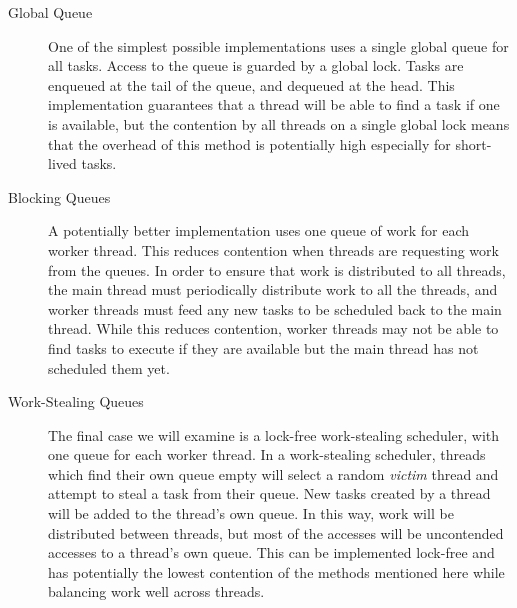 \begin{description}
\item[Global Queue] One of the simplest possible implementations uses a single global queue for all tasks. Access to the queue is guarded by a global lock. Tasks are enqueued at the tail of the queue, and dequeued at the head. This implementation guarantees that a thread will be able to find a task if one is available, but the contention by all threads on a single global lock means that the overhead of this method is potentially high especially for short-lived tasks.

\item[Blocking Queues] A potentially better implementation uses one queue of work for each worker thread. This reduces contention when threads are requesting work from the queues. In order to ensure that work is distributed to all threads, the main thread must periodically distribute work to all the threads, and worker threads must feed any new tasks to be scheduled back to the main thread. While this reduces contention, worker threads may not be able to find tasks to execute if they are available but the main thread has not scheduled them yet.

\item[Work-Stealing Queues] The final case we will examine is a lock-free work-stealing scheduler, with one queue for each worker thread. In a work-stealing scheduler, threads which find their own queue empty will select a random \emph{victim} thread and attempt to steal a task from their queue. New tasks created by a thread will be added to the thread's own queue. In this way, work will be distributed between threads, but most of the accesses will be uncontended accesses to a thread's own queue. This can be implemented lock-free and has potentially the lowest contention of the methods mentioned here while balancing work well across threads.
\end{description}
